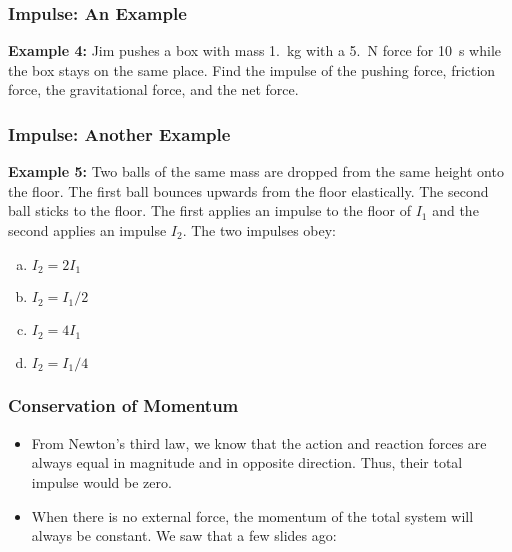 \documentclass[12pt,compress,aspectratio=169]{beamer}
\newcommand{\mb}[1]{\ensuremath\mathbf{#1}}
\newcommand{\eq}[2]{\vspace{#1}{\Large\begin{displaymath}#2\end{displaymath}}}
\begin{document}
\begin{frame}
  \frametitle{Impulse: An Example}
  \textbf{Example 4:} Jim pushes a box with mass \SI{1.}{\kilo\gram} with a
  \SI{5.}{\newton} force for \SI{10}{\second} while the box stays on the same
  place. Find the impulse of the pushing force, friction force, the
  gravitational force, and the net force.
\end{frame}

\begin{frame}
  \frametitle{Impulse: Another Example}
  \textbf{Example 5:} Two balls of the same mass are dropped from the same
  height onto the floor. The first ball bounces upwards from the floor
  elastically. The second ball sticks to the floor. The first applies an
  impulse to the floor of $I_1$ and the second applies an impulse $I_2$. The
  two impulses obey:
  \begin{enumerate}[(a)]
  \item $I_2=2I_1$
  \item $I_2=I_1/2$
  \item $I_2=4I_1$
  \item $I_2=I_1/4$
  \end{enumerate}
\end{frame}

\begin{frame}
  \frametitle{Conservation of Momentum}
  \begin{itemize}
  \item From Newton's third law, we know that the action and reaction forces are
    always equal in magnitude and in opposite direction. Thus, their total
    impulse would be zero. 
    
  \item When there is no external force, the momentum of the total system will
    always be constant. We saw that a few slides ago:

    \eq{-.2in}{
      \sum\mb{p}(t_1)=\sum\mb{p}(t_2)
    }
  \end{itemize}
\end{frame}
\end{document}
